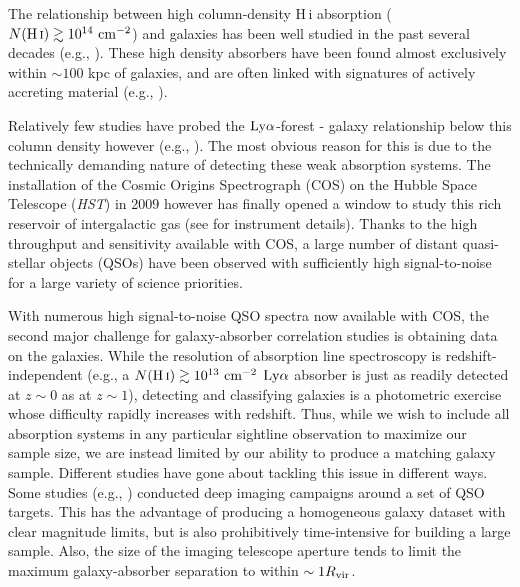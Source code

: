 \documentclass[twocolumn,tighten]{aastex62}
\newcommand{\HI}{\mbox{H\,{\sc i}} }
\begin{document}
The relationship between high column-density \HI absorption ($N(\HI) \gtrsim 10^{14} ~\rm cm^{-2}$) and galaxies has been well studied in the past several decades (e.g., \citealt{lanzetta1995, bowen1998, bowen2002, chen2003, chen2005, chen2008, steidel2010, prochaska2011b, diamond-stanic2016}). These high density absorbers have been found almost exclusively within $\sim 100$ kpc of galaxies, and are often linked with signatures of actively accreting material (e.g., \citealt{diamond-stanic2016}). 

Relatively few studies have probed the $\rm Ly\alpha$-forest - galaxy relationship below this column density however (e.g., \citealt{bowen2002, morris2006, wakker2009, french2017}). The most obvious reason for this is due to the technically demanding nature of detecting these weak absorption systems. The installation of the Cosmic Origins Spectrograph (COS) on the Hubble Space Telescope (\emph{HST}) in 2009 however has finally opened a window to study this rich reservoir of intergalactic gas (see \citealt{green2012} for instrument details).  Thanks to the high throughput and sensitivity available with COS, a large number of distant quasi-stellar objects (QSOs) have been observed with sufficiently high signal-to-noise for a large variety of science priorities. 

With numerous high signal-to-noise QSO spectra now available with COS, the second major challenge for galaxy-absorber correlation studies is obtaining data on the galaxies. While the resolution of absorption line spectroscopy is redshift-independent (e.g., a $N(\HI) \gtrsim 10^{13}  ~\rm cm^{-2}$ $\rm Ly\alpha$ absorber is just as readily detected at $z\sim0$ as at $z\sim 1$), detecting and classifying galaxies is a photometric exercise whose difficulty rapidly increases with redshift. Thus, while we wish to include all absorption systems in any particular sightline observation to maximize our sample size, we are instead limited by our ability to produce a matching galaxy sample. Different studies have gone about tackling this issue in different ways. Some studies (e.g., \citealt{bowen2002, chen2005, tumlinson2011, tumlinson2013, werk2013}) conducted deep imaging campaigns around a set of QSO targets. This has the advantage of producing a homogeneous galaxy dataset with clear magnitude limits, but is also prohibitively time-intensive for building a large sample. Also, the size of the imaging telescope aperture tends to limit the maximum galaxy-absorber separation to within $\sim 1 R_{\rm vir}$. 
\end{document}
